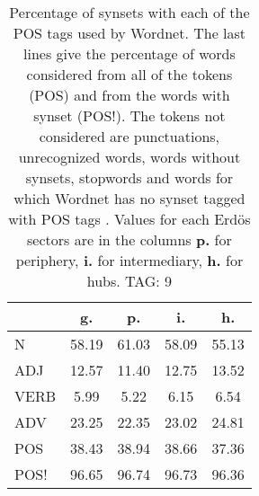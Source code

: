 \begin{table}[h!]
\begin{center}
\begin{tabular}{| l | c | c | c | c |}\hline
 & g. & p. & i. & h. \\\hline
N & 58.19  & 61.03  & 58.09  & 55.13 \\\hline
ADJ & 12.57  & 11.40  & 12.75  & 13.52 \\\hline
VERB & 5.99  & 5.22  & 6.15  & 6.54 \\\hline
ADV & 23.25  & 22.35  & 23.02  & 24.81 \\\hline
POS & 38.43  & 38.94  & 38.66  & 37.36 \\\hline
POS! & 96.65  & 96.74  & 96.73  & 96.36 \\\hline
\end{tabular}
\caption{Percentage of synsets with each of the POS tags used by Wordnet. The last lines give the percentage of words considered from all of the tokens (POS) and from the words with synset (POS!). The tokens not considered are punctuations, unrecognized words, words without synsets, stopwords and words for which Wordnet has no synset  tagged with POS tags . Values for each Erd\"os sectors are in the columns {{\bf p.}} for periphery, {{\bf i.}} for intermediary, {{\bf h.}} for hubs. TAG: 9}
\end{center}
\end{table}